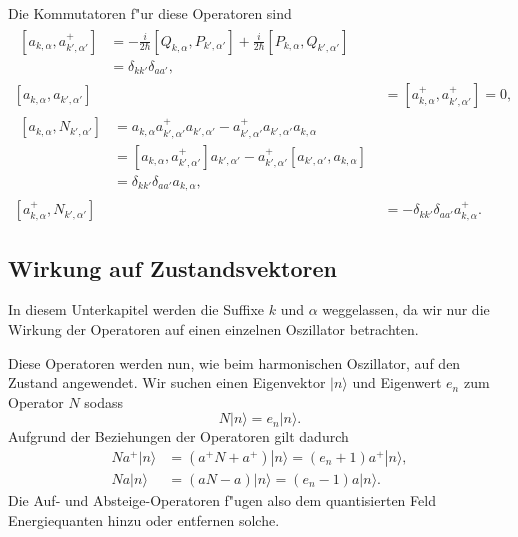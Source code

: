 \begin{refsection}
Die Kommutatoren f"ur diese Operatoren sind
\begin{align*}
\begin{split}
[a_{k,\alpha} , a^+_{k',\alpha'}] &= - \frac{i}{2 \hbar} [Q_{k,\alpha}, P_{k',\alpha'}] + \frac{i}{2 \hbar} [P_{k,\alpha}, Q_{k',\alpha'}] \\
	 &= \delta_{kk'}\delta_{aa'},
\end{split}\\
[a_{k,\alpha} , a_{k',\alpha'}] &= [a^+_{k,\alpha} , a^+_{k',\alpha'}] = 0, \\
\begin{split}
[a_{k,\alpha} , N_{k',\alpha'}] &= a_{k,\alpha} a^+_{k',\alpha'} a_{k',\alpha'} - a^+_{k',\alpha'} a_{k',\alpha'} a_{k,\alpha} \\
	&= [a_{k,\alpha} , a^+_{k',\alpha'}]a_{k',\alpha'} - a^+_{k',\alpha'}[a_{k',\alpha'} , a_{k,\alpha}]\\
	&= \delta_{kk'}\delta_{aa'} a_{k,\alpha},
\end{split} \\
[a^+_{k,\alpha} , N_{k',\alpha'}] &= -\delta_{kk'}\delta_{aa'} a^+_{k,\alpha}.
\end{align*}

\subsection{Wirkung auf Zustandsvektoren}

In diesem Unterkapitel werden die Suffixe $k$ und $\alpha$ weggelassen, da wir nur die Wirkung der Operatoren auf einen einzelnen Oszillator betrachten. 

Diese Operatoren werden nun, wie beim harmonischen Oszillator, auf den Zustand angewendet. Wir suchen einen Eigenvektor $|n\rangle$ und Eigenwert $e_n$ zum Operator $N$ sodass
\begin{equation*}
N|n\rangle = e_n|n\rangle.
\end{equation*}
Aufgrund der Beziehungen der Operatoren gilt dadurch
\begin{align*}
Na^+|n\rangle &= (a^+N + a^+)|n\rangle = (e_n + 1)a^+|n\rangle, \\
Na|n\rangle &= (aN - a)|n\rangle = (e_n - 1)a|n\rangle.
\end{align*}
Die Auf- und Absteige-Operatoren f"ugen also dem quantisierten Feld Energiequanten hinzu oder entfernen solche.


\end{refsection}
